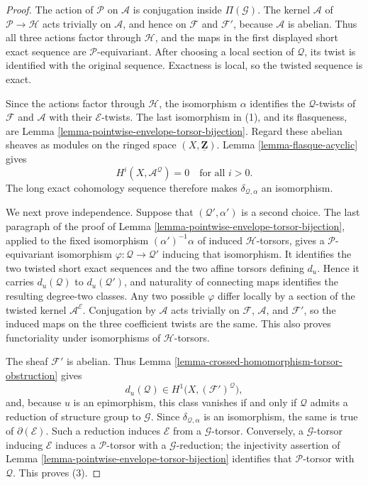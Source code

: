 \begin{proof}
The action of $\mathcal P$ on $\mathcal A$ is conjugation inside
$\Pi(\mathcal G)$. The kernel $\mathcal A$ of
$\mathcal P\to\mathcal H$ acts trivially on $\mathcal A$, and hence on
$\mathcal F$ and $\mathcal F'$, because $\mathcal A$ is abelian. Thus all
three actions factor through $\mathcal H$, and the maps in the first
displayed short exact sequence are $\mathcal P$-equivariant. After choosing
a local section of $\mathcal Q$, its twist is identified with the original
sequence. Exactness is local, so the twisted sequence is exact.

Since the actions factor through $\mathcal H$, the isomorphism $\alpha$
identifies the $\mathcal Q$-twists of $\mathcal F$ and $\mathcal A$ with
their $\mathcal E$-twists. The last isomorphism in (1), and its flasqueness,
are Lemma \ref{lemma-pointwise-envelope-torsor-bijection}. Regard these
abelian sheaves as modules on the ringed space
$(X,\underline{\mathbf Z})$. Lemma \ref{lemma-flasque-acyclic} gives
$$
H^i(X,\mathcal A^{\mathcal Q})=0\quad\text{for all }i>0.
$$
The long exact cohomology sequence therefore makes
$\delta_{\mathcal Q,\alpha}$ an isomorphism.

We next prove independence. Suppose that $(\mathcal Q',\alpha')$ is a
second choice. The last paragraph of the proof of
Lemma \ref{lemma-pointwise-envelope-torsor-bijection}, applied to the fixed
isomorphism $(\alpha')^{-1}\alpha$ of induced $\mathcal H$-torsors, gives a
$\mathcal P$-equivariant isomorphism
$\varphi:\mathcal Q\to\mathcal Q'$ inducing that isomorphism. It identifies
the two twisted short exact sequences and the two affine torsors defining
$d_u$. Hence it carries $d_u(\mathcal Q)$ to $d_u(\mathcal Q')$, and
naturality of connecting maps identifies the resulting degree-two classes.
Any two possible $\varphi$ differ locally by a section of the twisted
kernel $\mathcal A^{\mathcal E}$. Conjugation by $\mathcal A$ acts trivially
on $\mathcal F$, $\mathcal A$, and $\mathcal F'$, so the induced maps on
the three coefficient twists are the same. This also proves functoriality
under isomorphisms of $\mathcal H$-torsors.

The sheaf $\mathcal F'$ is abelian. Thus
Lemma \ref{lemma-crossed-homomorphism-torsor-obstruction} gives
$$
d_u(\mathcal Q)\in H^1\bigl(X,(\mathcal F')^{\mathcal Q}\bigr),
$$
and, because $u$ is an epimorphism, this class vanishes if and only if
$\mathcal Q$ admits a reduction of structure group to $\mathcal G$.
Since $\delta_{\mathcal Q,\alpha}$ is an isomorphism, the same is true of
$\partial(\mathcal E)$. Such a reduction induces $\mathcal E$ from a
$\mathcal G$-torsor. Conversely, a $\mathcal G$-torsor inducing
$\mathcal E$ induces a $\mathcal P$-torsor with a $\mathcal G$-reduction;
the injectivity assertion of
Lemma \ref{lemma-pointwise-envelope-torsor-bijection} identifies that
$\mathcal P$-torsor with $\mathcal Q$. This proves (3).


\end{proof}
